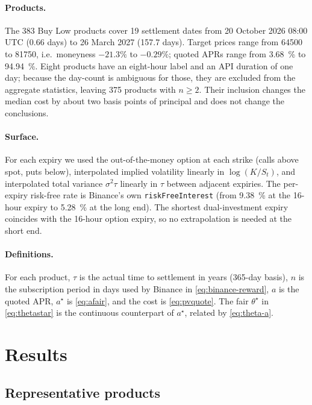 \documentclass[11pt]{article}
\begin{document}
\paragraph{Products.} The 383 Buy Low products cover 19 settlement dates from 20 October 2026 08:00 UTC (\SI{0.66}{} days) to 26 March 2027 (\SI{157.7}{} days). Target prices range from \num{64500} to \num{81750}, i.e.\ moneyness $-21.3\%$ to $-0.29\%$; quoted APRs range from \SI{3.68}{\percent} to \SI{94.94}{\percent}. Eight products have an eight-hour label and an API duration of one day; because the day-count is ambiguous for those, they are excluded from the aggregate statistics, leaving 375 products with $n\ge2$. Their inclusion changes the median cost by about two basis points of principal and does not change the conclusions.

\paragraph{Surface.} For each expiry we used the out-of-the-money option at each strike (calls above spot, puts below), interpolated implied volatility linearly in $\log(K/S_t)$, and interpolated total variance $\sigma^2\tau$ linearly in $\tau$ between adjacent expiries. The per-expiry risk-free rate is Binance's own \texttt{riskFreeInterest} (from \SI{9.38}{\percent} at the 16-hour expiry to \SI{5.28}{\percent} at the long end). The shortest dual-investment expiry coincides with the 16-hour option expiry, so no extrapolation is needed at the short end.

\paragraph{Definitions.} For each product, $\tau$ is the actual time to settlement in years (365-day basis), $n$ is the subscription period in days used by Binance in \eqref{eq:binance-reward}, $a$ is the quoted APR, $a^\star$ is \eqref{eq:afair}, and the cost is \eqref{eq:pvquote}. The fair $\theta^\star$ in \eqref{eq:thetastar} is the continuous counterpart of $a^\star$, related by \eqref{eq:theta-a}.

\section{Results}\label{sec:results}

\subsection{Representative products}
\end{document}
